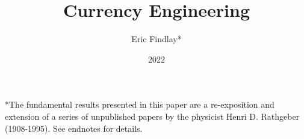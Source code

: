 \documentclass[a4paper]{article}
\begin{document}
    \title{Currency Engineering}
    \author{Eric Findlay*}
    \date{2022}
    \maketitle

    *The fundamental results presented in this paper are a re-exposition and extension of a series
    of unpublished papers by the physicist Henri D. Rathgeber (1908-1995). See endnotes for details.

    \tableofcontents
    \newpage

    
    
    
    
    
    
    
    
    
    
    
    
    
\end{document}
